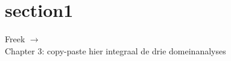 \section{section1}

\begin{tcolorbox}[colback=yellow!30]
 Freek $\rightarrow$ \\
 Chapter 3: copy-paste hier integraal de drie domeinanalyses
\end{tcolorbox}

